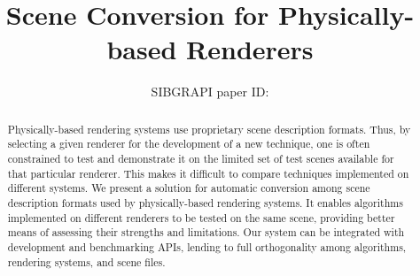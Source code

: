 \documentclass[10pt,conference]{IEEEtran}
\title{Scene Conversion for Physically-based Renderers}
\author{\IEEEauthorblockN{Luiza Hagemann}
\IEEEauthorblockA{Instituto de Inform\'{a}tica - UFRGS\\
Porto Alegre, RS, Brazil\\
lahagemann@inf.ufrgs.br}
\and
\IEEEauthorblockN{Manuel M. Oliveira}
\IEEEauthorblockA{Instituto de Inform\'{a}tica - UFRGS\\
Porto Alegre, RS, Brazil\\
oliveira@inf.ufrgs.br}}
\author{SIBGRAPI paper ID: \jemsid \\ }
\begin{document}
	

\begin{abstract}
Physically-based rendering systems use proprietary scene description formats. Thus, by selecting a given renderer for the development of a new technique, one is often constrained to test and demonstrate it on the limited set of test scenes available for that particular renderer. This makes it difficult to compare techniques implemented on different systems. 
We present a solution for automatic conversion among scene description formats used by physically-based rendering systems. 
It enables algorithms implemented on different renderers to be tested on the same scene, providing better means of assessing their strengths and limitations. 
Our system can be integrated with development and benchmarking APIs, lending to full orthogonality among algorithms, rendering systems, and scene files.
\end{abstract}
\end{document}

